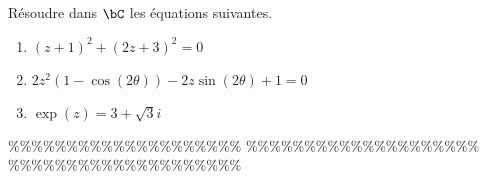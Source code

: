 



\begin{exercice}  \;
R\'esoudre dans $\bC$ les \'equations suivantes.
\begin{enumerate}
\item $(z+1)^2+(2z+3)^2=0$
\item $2z^2(1-\cos{(2\theta)})-2z\sin{(2\theta)}+1=0$
\item $\exp(z)=3+\sqrt{3}i$
\end{enumerate}
\end{exercice}


\%\%\%\%\%\%\%\%\%\%\%\%\%\%\%\%\%\%\%\%
\%\%\%\%\%\%\%\%\%\%\%\%\%\%\%\%\%\%\%\%
\%\%\%\%\%\%\%\%\%\%\%\%\%\%\%\%\%\%\%\%





